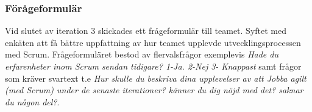 \subsubsection {Förågeformulär}
Vid slutet av iteration 3 skickades ett frågeformulär till teamet. Syftet med enkäten att få bättre uppfattning av hur teamet upplevde utvecklingsprocessen med Scrum. Frågeformuläret bestod av flervalsfrågor exemplevis  \textit{Hade du erfarenheter inom Scrum sendan tidigare? 1-Ja. 2-Nej 3- Knappast} samt frågor som kräver svartext t.e \textit{Hur skulle du beskriva dina upplevelser av att Jobba agilt (med Scrum) under de senaste iterationer? känner du dig nöjd med det? saknar du någon del?}. 